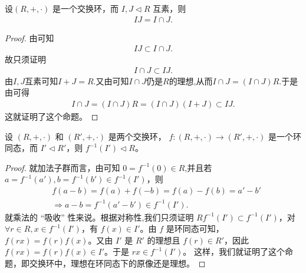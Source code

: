 \documentclass[../../main.tex]{subfiles}
\begin{document}
\begin{proposition}\label{proposition:理想的乘积等于理想的交当且仅当它们互素}
设$(R, +, \cdot)$ 是一个交换环，而 $I, J \lhd R$ 互素，则
\begin{align*}
IJ = I \cap J.
\end{align*}
\end{proposition}
\begin{proof}
由可知
\begin{align*}
IJ \subset I \cap J.
\end{align*}
故只须证明
\begin{align*}
I \cap J \subset IJ.
\end{align*}
由$I,J$互素可知$I+J=R$.又由可知$I\cap J$仍是$R$的理想,从而$I \cap J = (I \cap J)R .$于是由可得
\begin{align*}
I \cap J = (I \cap J)R = (I \cap J)(I + J) \subset IJ.
\end{align*}
这就证明了这个命题。
\end{proof}

\begin{proposition}\label{proposition:交换环中，理想在环同态下的原像还是理想}
设 $(R, +, \cdot)$ 和 $(R', +, \cdot)$ 是两个交换环， $f : (R, +, \cdot) \to (R', +, \cdot)$ 是一个环同态，而 $I' \lhd R'$，则 $f^{-1}(I') \lhd R$。
\end{proposition}
\begin{proof}
就加法子群而言，由可知 $0 = f^{-1}(0) \in R$,并且若 $a = f^{-1}(a'), b = f^{-1}(b') \in f^{-1}(I')$，则
\begin{align*}
&f\left( a-b \right) =f\left( a \right) +f\left( -b \right) =f\left( a \right) -f\left( b \right) =a' -b'
\\
&\Rightarrow a-b=f^{-1}(a'-b')\in f^{-1}(I' ).
\end{align*}
就乘法的 “吸收” 性来说。根据对称性,我们只须证明 $Rf^{-1}(I') \subset f^{-1}(I')$，对 $\forall r \in R, x \in f^{-1}(I')$，有 $f(x) \in I'$。由 $f$ 是环同态可知，$f(rx) = f(r)f(x)$。又由 $I'$ 是 $R'$ 的理想且 $f(r) \in R'$，因此 $f(rx) = f(r)f(x) \in I'$。于是 $rx \in f^{-1}(I')$。 
这样，我们就证明了这个命题，即交换环中，理想在环同态下的原像还是理想。 
\end{proof}
\end{document}
